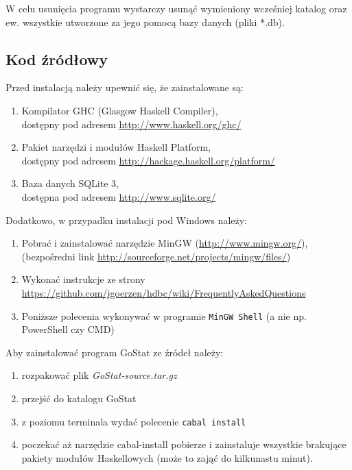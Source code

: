 \documentclass[10pt,leqno]{article}
\newcommand{\cmd}[1]{
  \texttt{#1}
}
\begin{document}
W celu usunięcia programu wystarczy usunąć wymieniony wcześniej katalog oraz ew. wszystkie utworzone za jego pomocą bazy danych (pliki *.db).

\subsection{Kod źródłowy}
Przed instalacją należy upewnić się, że zainstalowane są:

\begin{enumerate}
\item Kompilator GHC (Glasgow Haskell Compiler), \\ dostępny pod adresem  \url{http://www.haskell.org/ghc/}
\item Pakiet narzędzi i modułów Haskell Platform, \\ dostępny pod adresem \url{http://hackage.haskell.org/platform/}
\item Baza danych SQLite 3, \\ dostępna pod adresem \url{http://www.sqlite.org/}
\end{enumerate}

\noindent Dodatkowo, w przypadku instalacji pod Windows należy:

\begin{enumerate}
\item Pobrać i zainstalować narzędzie MinGW (\url{http://www.mingw.org/}), \\ (bezpośredni link \url{http://sourceforge.net/projects/mingw/files/})
\item Wykonać instrukcje ze strony \url{https://github.com/jgoerzen/hdbc/wiki/FrequentlyAskedQuestions}
\item Poniższe polecenia wykonywać w programie \cmd{MinGW Shell} (a nie np. PowerShell czy CMD)
\end{enumerate}


\noindent Aby zainstalować program GoStat ze źródeł należy:

\begin{enumerate}
\item rozpakować plik \emph{GoStat-source.tar.gz}
\item przejść do katalogu GoStat
\item z poziomu terminala wydać polecenie \cmd{cabal install}
\item poczekać aż narzędzie cabal-install pobierze i zainstaluje wszystkie brakujące pakiety modułów Haskellowych (może to zająć do kilkunastu minut).
\end{enumerate}
\end{document}
